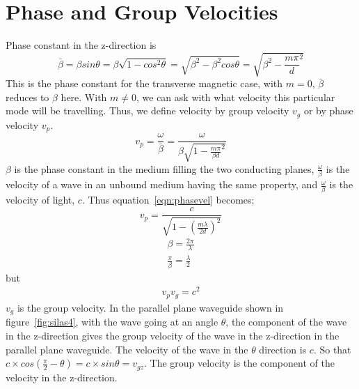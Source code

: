 \section{Phase and Group Velocities}
Phase constant in the z-direction is
\begin{dmath*}
\bar{\beta} = \beta sin\theta = \beta \sqrt{1- cos^{2}\theta} =\sqrt{\beta^{2} -\beta^{2}cos\theta} = \sqrt{\beta^{2} -\frac{m\pi}{d}^{2}}
\end{dmath*}
This is the phase constant for the transverse magnetic case, with $m = 0$, $\bar{\beta}$ reduces to $\beta$ here. With $m\neq 0$, we can ask with what velocity this particular mode will be travelling. Thus, we define velocity by group velocity $v_{g}$ or by phase velocity $v_{p}$. 
\begin{dmath}
 v_{p}=\frac{\omega}{\bar{\beta}} =\frac{\omega}{\beta \sqrt{1- \frac{m \pi}{\beta d}^{2}}}
\label{eqn:phasevel}
\end{dmath}
$\beta$ is the phase constant in the medium filling the two conducting planes, $\frac{\omega}{\beta}$ is the velocity of a wave in an unbound medium having the same property, and $\frac{\omega}{\beta}$ is the velocity of light, $c$. Thus equation~\ref{eqn:phasevel} becomes;
\begin{equation*}
v_{p} =\frac{c}{\sqrt{1-(\frac{m\lambda}{2d})^{2}}}
\end{equation*}
\begin{align*}
\beta =\frac{2\pi}{\lambda}\\
\frac{\pi}{\beta} =\frac{\lambda}{2}
\end{align*}
but 
\begin{align}
v_{p} v_{g}= c^{2}
\label{eqn:grpvel}
\end{align}
$v_{g}$ is the group velocity. In the parallel plane waveguide shown in figure~\ref{fig:silas4}, with the wave going at an angle $\theta$, the component of the wave in the z-direction gives the group velocity of the wave in the z-direction in the parallel plane waveguide. The velocity of the wave in the $\theta$ direction is $c$. So that $c\times cos(\frac{\pi}{2} - \theta)= c\times sin\theta= v_{gz}$. The group velocity is the component of the velocity in the z-direction.
